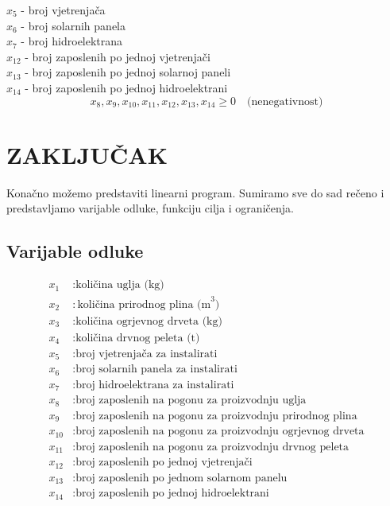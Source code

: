 \documentclass[12pt, a4paper]{paper}
\begin{document}
$x_5$ - broj vjetrenjača\\
$x_6$ - broj solarnih panela\\
$x_7$ - broj hidroelektrana\\
$x_{12}$ - broj zaposlenih po jednoj vjetrenjači\\
$x_{13}$ - broj zaposlenih po jednoj solarnoj paneli\\
$x_{14}$ - broj zaposlenih po jednoj hidroelektrani
\[ x_{8}, x_{9}, x_{10}, x_{11}, x_{12}, x_{13}, x_{14} \geq 0\quad \text{(nenegativnost)}\]

\newpage
\section*{ZAKLJUČAK}

Konačno možemo predstaviti linearni program. Sumiramo sve do sad rečeno i predstavljamo varijable odluke, funkciju cilja i ograničenja.
\subsection*{Varijable odluke}
\begin{align*}
	x_1 &: \text{količina uglja (kg)} \\
	x_2 &: \text{količina prirodnog plina (m}^3\text{)} \\
	x_3 &: \text{količina ogrjevnog drveta (kg)} \\
	x_4 &: \text{količina drvnog peleta (t)} \\
	x_5 &: \text{broj vjetrenjača za instalirati} \\
	x_6 &: \text{broj solarnih panela za instalirati} \\
	x_7 &: \text{broj hidroelektrana za instalirati} \\
	x_8 &: \text{broj zaposlenih na pogonu za proizvodnju uglja} \\
	x_9 &: \text{broj zaposlenih na pogonu za proizvodnju prirodnog plina} \\
	x_{10} &: \text{broj zaposlenih na pogonu za proizvodnju ogrjevnog drveta} \\
	x_{11} &: \text{broj zaposlenih na pogonu za proizvodnju drvnog peleta} \\
	x_{12} &: \text{broj zaposlenih po jednoj vjetrenjači} \\
	x_{13} &: \text{broj zaposlenih po jednom solarnom panelu} \\
	x_{14} &: \text{broj zaposlenih po jednoj hidroelektrani}
\end{align*}
\end{document}
